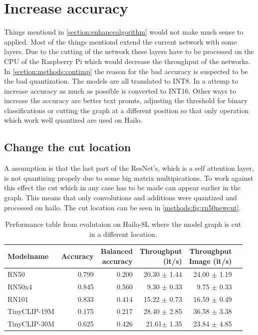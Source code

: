 \section{Increase accuracy}

Things mentiond in \cref{section:enhancealgorithm} would not make much sense to applied.
Most of the things mentiond extend the current network with some layers.
Due to the cutting of the network these layers have to be processed on the CPU of the Raspberry Pi which would decrease the throughput of the networks.
In \cref{scetion:methods:contimp} the reason for the bad accuracy is suspected to be the bad quantization.
The models are all translated to INT8.
In a attemp to increase accuracy as much as possible is converted to INT16.
Other ways to increase the accuracy are better text promts, adjusting the threshold for binary classifications or cutting the graph at a different position so that only operation which work well quantized are used on Hailo.

\subsection{Change the cut location
\label{methods:sec:cutlocation}}
A assumption is that the last part of the ResNet's, which is a self attention layer, is not quantizing propely due to some big matrix multipications.
To work against this effect the cut which in any case has to be made can appear earlier in the graph.
This means that only convolutions and additions were quantized and processed on hailo.
The cut location can be seen in \cref{methods:fig:rn50newcut}.

\begin{table}[]
    \centering
    \begin{tabular}{l|rrrrr}
        \hline
        Modelname & Accuracy &  \makecell{Balanced \\accuracy}&\makecell{Throughput\\(it/s)} & \makecell{Throughput \\ Image (it/s)} & \\ \hline
        RN50 & 0.799 & 0.200 & 20.30 $\pm$ 1.44 & 24.00 $\pm$ 1.19  \\ 
        RN50x4 & 0.845 & 0.560 & 9.30  $\pm$ 0.33 & 9.75  $\pm$ 0.33\\
        RN101 & 0.833& 0.414 & 15.22 $\pm$ 0.73 & 16.59 $\pm$ 0.49\\  
        TinyCLIP-19M & 0.175 & 0.217 & 28.40 $\pm$ 2.85 & 36.58 $\pm$ 3.38 \\ 
        TinyCLIP-30M & 0.625 & 0.426 & 21.61$\pm$ 1.35 & 23.84 $\pm$ 4.85\\ 
    \end{tabular}
    \caption{Performance table from evalutaion on Hailo-8L where the model graph is cut in a different location.}
    \label{methods:tab:perfHailocut}
\end{table}

